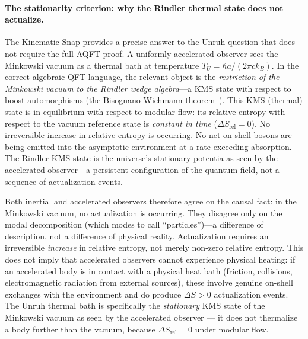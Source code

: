 \documentclass[11pt,a4paper]{article}
\theoremstyle{plain}
\theoremstyle{definition}
\theoremstyle{remark}
\begin{document}
\paragraph{The stationarity criterion: why the Rindler thermal state does not actualize.}
The Kinematic Snap provides a precise answer to the Unruh question that does not
require the full AQFT proof. A uniformly accelerated observer sees the Minkowski
vacuum as a thermal bath at temperature $T_U = \hbar a / (2\pi c k_B)$. In the
correct algebraic QFT language, the relevant object is the \emph{restriction of
the Minkowski vacuum to the Rindler wedge algebra}---a KMS state with respect to
boost automorphisms (the Bisognano-Wichmann theorem~\citep{BisognanoWichmann1975}).
This KMS (thermal) state is in equilibrium with respect to modular flow: its
relative entropy with respect to the vacuum reference state is
\emph{constant in time} ($\Delta S_{\mathrm{rel}} = 0$).
No irreversible increase in relative entropy is occurring. No net on-shell bosons
are being emitted into the asymptotic environment at a rate exceeding absorption.
The Rindler KMS state is the universe's stationary potentia as seen by the
accelerated observer---a persistent configuration of the quantum field, not a
sequence of actualization events.

Both inertial and accelerated observers therefore agree on the causal fact: in the
Minkowski vacuum, no actualization is occurring. They disagree only on the modal
decomposition (which modes to call ``particles'')---a difference of description,
not a difference of physical reality. Actualization requires an irreversible
\emph{increase} in relative entropy, not merely non-zero relative entropy.
This does not imply that accelerated observers cannot experience physical heating:
if an accelerated body is in contact with a physical heat bath
(friction, collisions, electromagnetic radiation from external sources),
these involve genuine on-shell exchanges with the environment and do produce
$\Delta S > 0$ actualization events. The Unruh thermal bath is
specifically the \emph{stationary} KMS state of the Minkowski vacuum
as seen by the accelerated observer --- it does not thermalize a body further
than the vacuum, because $\Delta S_{\mathrm{rel}} = 0$ under modular flow.
\end{document}
